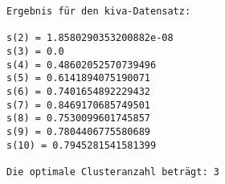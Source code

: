 \documentclass[12pt]{article}
\begin{document}
    \begin{Verbatim}[commandchars=\\\{\}]
Ergebnis für den kiva-Datensatz:

s(2) = 1.8580290353200882e-08
s(3) = 0.0
s(4) = 0.48602052570739496
s(5) = 0.6141894075190071
s(6) = 0.7401654892229432
s(7) = 0.8469170685749501
s(8) = 0.7530099601745857
s(9) = 0.7804406775580689
s(10) = 0.7945281541581399

Die optimale Clusteranzahl beträgt: 3

    \end{Verbatim}


    
    
    
    
\end{document}
